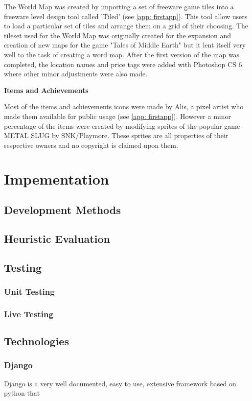 \documentclass{mproj}
\begin{document}
The World Map was created by importing a set of freeware game tiles into a freeware level design tool called 'Tiled' (see \ref{app: firstapp}). This tool allow users to load a particular set of tiles and arrange them on a grid of their choosing. The tileset used for the World Map was originally created for the expansion and creation of new maps for the game "Tales of Middle Earth" but it lent itself very well to the task of creating a word map. After the first version of the map was completed, the location names and price tags were added with Photoshop CS 6 where other minor adjustments were also made.

\textbf{Items and Achievements}

Most of the items and achievements icons were made by Alis, a pixel artist who made them available for public usage (see \ref{app: firstapp}). However a minor percentage of the items were created by modifying sprites of the popular game METAL SLUG  by SNK/Playmore. These sprites are all properties of their respective owners and no copyright is claimed upon them. 


\chapter{Impementation}
\label{implementation}


\section{Development Methods}
\section{Heuristic Evaluation}
\section{Testing}
\subsection{Unit Testing}
\subsection{Live Testing}
\section{Technologies}
\subsection{Django}
Django is a very well documented, easy to use, extensive framework based on python that 
\label{subsec:Django}
\end{document}
